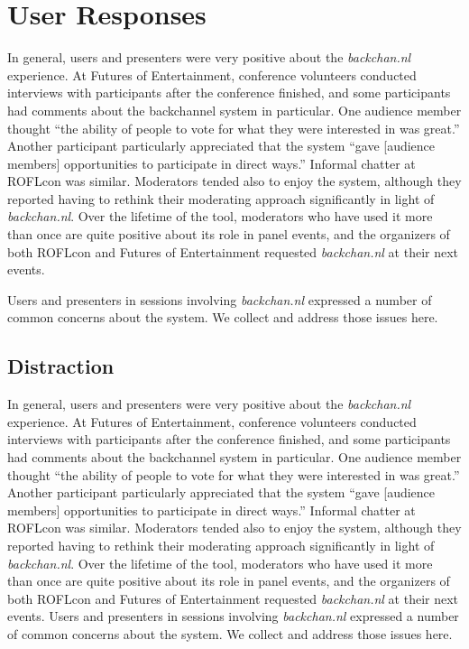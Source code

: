 \section{User Responses}

In general, users and presenters were very positive about the \emph{backchan.nl} experience. At Futures of Entertainment, conference volunteers conducted interviews with participants after the conference finished, and some participants had comments about the backchannel system in particular. One audience member thought ``the ability of people to vote for what they were interested in was great.'' Another participant particularly appreciated that the system ``gave [audience members] opportunities to participate in direct ways.'' Informal chatter at ROFLcon was similar. Moderators tended also to enjoy the system, although they reported having to rethink their moderating approach significantly in light of \emph{backchan.nl}. Over the lifetime of the tool, moderators who have used it more than once are quite positive about its role in panel events, and the organizers of both ROFLcon and Futures of Entertainment requested \emph{backchan.nl} at their next events.

Users and presenters in sessions involving \emph{backchan.nl} expressed a number of common concerns about the system. We collect and address those issues here.


\subsection{Distraction}
In general, users and presenters were very positive about the \emph{backchan.nl} experience. At Futures of Entertainment, conference volunteers conducted interviews with participants after the conference finished, and some participants had comments about the backchannel system in particular. One audience member thought ``the ability of people to vote for what they were interested in was great.'' Another participant particularly appreciated that the system ``gave [audience members] opportunities to participate in direct ways.'' Informal chatter at ROFLcon was similar. Moderators tended also to enjoy the system, although they reported having to rethink their moderating approach significantly in light of \emph{backchan.nl}. Over the lifetime of the tool, moderators who have used it more than once are quite positive about its role in panel events, and the organizers of both ROFLcon and Futures of Entertainment requested \emph{backchan.nl} at their next events. 
Users and presenters in sessions involving \emph{backchan.nl} expressed a number of common concerns about the system. We collect and address those issues here.

